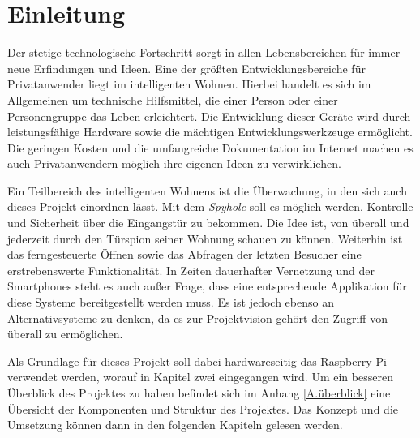
\chapter{Einleitung}
Der stetige technologische Fortschritt sorgt in allen Lebensbereichen für immer neue Erfindungen und Ideen. Eine der größten Entwicklungsbereiche für Privatanwender liegt im intelligenten Wohnen. Hierbei handelt es sich im Allgemeinen um technische Hilfsmittel, die einer Person oder einer Personengruppe das Leben erleichtert. Die Entwicklung dieser Geräte wird durch leistungsfähige Hardware sowie die mächtigen Entwicklungswerkzeuge ermöglicht. Die geringen Kosten und die umfangreiche Dokumentation im Internet machen es auch Privatanwendern möglich ihre eigenen Ideen zu verwirklichen.  
\par
Ein Teilbereich des intelligenten Wohnens ist die Überwachung, in den sich auch dieses Projekt einordnen lässt. Mit dem \textit{Spyhole} soll es möglich werden, Kontrolle und Sicherheit über die Eingangstür zu bekommen. Die Idee ist, von überall und jederzeit durch den Türspion seiner Wohnung schauen zu können. Weiterhin ist das ferngesteuerte Öffnen sowie das Abfragen der letzten Besucher eine erstrebenswerte Funktionalität. In Zeiten dauerhafter Vernetzung und der Smartphones steht es auch außer Frage, dass eine entsprechende Applikation für diese Systeme bereitgestellt werden muss. Es ist jedoch ebenso an Alternativsysteme zu denken, da es zur Projektvision gehört den Zugriff von überall zu ermöglichen. 
\par
Als Grundlage für dieses Projekt soll dabei hardwareseitig das Raspberry Pi verwendet werden, worauf in Kapitel zwei eingegangen wird. Um ein besseren Überblick des Projektes zu haben befindet sich im Anhang \ref{A.überblick} eine Übersicht der Komponenten und Struktur des Projektes. Das Konzept und die Umsetzung können dann in den folgenden Kapiteln gelesen werden.